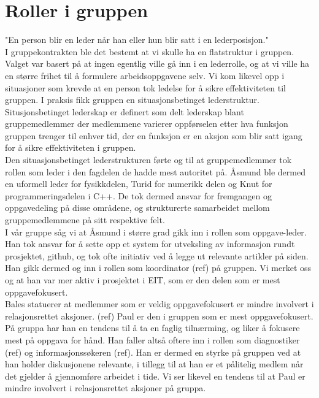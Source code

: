 \section{Roller i gruppen}
"En person blir en leder når han eller hun blir satt i en lederposisjon."\\

I gruppekontrakten ble det bestemt at vi skulle ha en flatstruktur i gruppen. Valget 
var basert på at ingen egentlig ville gå inn i en lederrolle, og at vi ville ha en 
større frihet til å formulere arbeidsoppgavene selv. Vi kom likevel opp i situasjoner
som krevde at en person tok ledelse for å sikre effektiviteten til gruppen. I praksis 
fikk gruppen en situasjonsbetinget lederstruktur. Situsjonsbetinget lederskap er definert
som delt lederskap blant gruppemedlemmer der medlemmene varierer oppførselen etter hva
funksjon gruppen trenger til enhver tid, der en funksjon er en aksjon som blir satt 
igang for å sikre effektiviteten i gruppen.\\

Den situasjonsbetinget lederstrukturen førte og til at gruppemedlemmer tok rollen som 
leder i den fagdelen de hadde mest autoritet på. Åsmund ble dermed en uformell leder 
for fysikkdelen, Turid for numerikk delen og Knut for programmeringsdelen i C++. De 
tok dermed ansvar for fremgangen og oppgavedeling på disse områdene, og strukturerte 
samarbeidet mellom gruppemedlemmene på sitt respektive felt. \\

I vår gruppe såg vi at Åsmund i større grad gikk inn i rollen som oppgave-leder. Han 
tok ansvar for å sette opp et system for utveksling av informasjon rundt prosjektet, 
github, og tok ofte initiativ ved å legge ut relevante artikler på siden. Han gikk 
dermed og inn i rollen som koordinator (ref) på gruppen. Vi merket oss og at han var 
mer aktiv i prosjektet i EIT, som er den delen som er mest oppgavefokusert. \\

Bales statuerer at medlemmer som er veldig oppgavefokusert er mindre involvert i 
relasjonsrettet aksjoner. (ref) Paul er den i gruppen som er mest oppgavefokusert. 
På gruppa har han en tendens til å ta en faglig tilnærming, og liker å fokusere mest 
på oppgava for hånd. Han faller altså oftere inn i rollen som diagnostiker (ref) og 
informasjonssøkeren (ref). Han er dermed en styrke på gruppen ved at han holder 
diskusjonene relevante, i tillegg til at han er et pålitelig medlem når det gjelder 
å gjennomføre arbeidet i tide. Vi ser likevel en tendens til at Paul er mindre involvert 
i relasjonsrettet aksjoner på gruppa. \\

